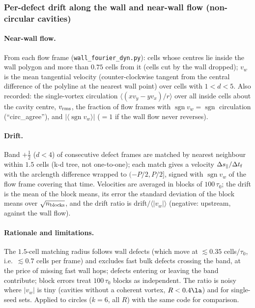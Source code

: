 \subsubsection{Per-defect drift along the wall and near-wall flow (non-circular cavities)}
\label{sec:md-drift}

\paragraph{Near-wall flow.} From each flow frame (\texttt{wall\_fourier\_dyn.py}): cells whose centres lie inside the wall polygon and more than
$0.75$ cells from it (cells cut by the wall dropped); $v_w$ is the mean tangential velocity (counter-clockwise tangent from the central
difference of the polyline at the nearest wall point) over cells with $1<d<5$. Also recorded: the single-vortex circulation
$\langle(x v_y-y v_x)/r\rangle$ over all inside cells about the cavity centre, $v_{\rm rms}$, the fraction of flow frames with
$\operatorname{sgn}v_w=\operatorname{sgn}$ circulation (``circ\_agree''), and $|\langle\operatorname{sgn}v_w\rangle|$ ($=1$ if the wall flow never reverses).

\paragraph{Drift.} Band $+\tfrac12$ ($d<4$) of consecutive defect frames are matched by nearest neighbour within $1.5$ cells (k-d tree, not
one-to-one); each match gives a velocity $\Delta s_\parallel/\Delta t_{\rm f}$ with the arclength difference wrapped to $(-P/2,P/2]$, signed with
$\operatorname{sgn}v_w$ of the flow frame covering that time. Velocities are averaged in blocks of $100\,\tau_0$; the drift is the mean of
the block means, its error the standard deviation of the block means over $\sqrt{n_{\rm blocks}}$, and the drift ratio is
drift$/\langle|v_w|\rangle$ (negative: upstream, against the wall flow).
\paragraph{Rationale and limitations.} The $1.5$-cell matching radius follows wall defects (which move at $\lesssim0.35$ cells$/\tau_0$, i.e.\
$\lesssim0.7$ cells per frame) and excludes fast bulk defects crossing the band, at the price of missing fast wall hops; defects entering or
leaving the band contribute; block errors treat $100\,\tau_0$ blocks as independent. The ratio is noisy where $|v_w|$ is tiny (cavities without
a coherent vortex, $R<0.4\la$) and for single-seed sets. Applied to circles ($k=6$, all $R$) with the same code for comparison.


